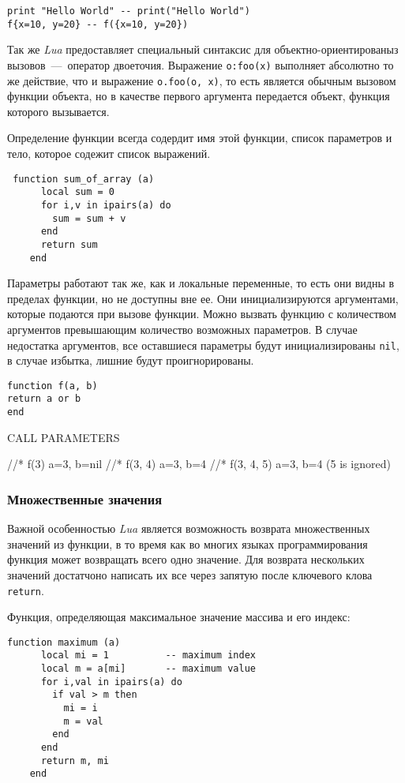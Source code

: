 \begin{lstlisting}
print "Hello World" -- print("Hello World")
f{x=10, y=20} -- f({x=10, y=20})
\end{lstlisting}

Так же \emph{Lua} предоставляет специальный синтаксис для объектно-ориентированыз вызовов~---~оператор двоеточия. Выражение \lstinline{o:foo(x)} выполняет абсолютно то же действие, что и выражение \lstinline{o.foo(o, x)}, то есть является обычным вызовом функции объекта, но в качестве первого аргумента передается объект, функция которого вызывается. 

Определение функции всегда содердит имя этой функции, список параметров и тело, которое содежит список выражений.

\begin{lstlisting}
 function sum_of_array (a)
      local sum = 0
      for i,v in ipairs(a) do
        sum = sum + v
      end
      return sum
    end
\end{lstlisting}

Параметры работают так же, как и локальные переменные, то есть они видны в пределах функции, но не доступны вне ее. Они инициализируются аргументами, которые подаются при вызове функции. Можно вызвать функцию с количеством аргументов превышающим количество возможных параметров. В случае недостатка аргументов, все оставшиеся параметры будут инициализированы \lstinline{nil}, в случае избытка, лишние будут проигнорированы.

\begin{lstlisting}
function f(a, b) 
return a or b 
end
\end{lstlisting}
CALL             PARAMETERS
       
//* f(3)             a=3, b=nil
//* f(3, 4)          a=3, b=4
//* f(3, 4, 5)       a=3, b=4   (5 is ignored)


\subsubsection{Множественные значения}
Важной особенностью \emph{Lua} является возможность возврата множественных значений из функции, в то время как во многих языках программирования функция может возвращать всего одно значение. Для возврата нескольких значений достатчоно написать их все через запятую после ключевого клова \lstinline{return}.


Функция, определяющая максимальное значение массива и его индекс:
\begin{lstlisting}
function maximum (a)
      local mi = 1          -- maximum index
      local m = a[mi]       -- maximum value
      for i,val in ipairs(a) do
        if val > m then
          mi = i
          m = val
        end
      end
      return m, mi
    end
\end{lstlisting}

